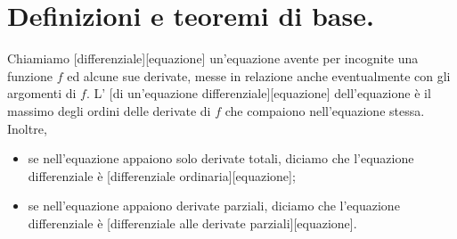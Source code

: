 \section{Definizioni e teoremi di base.}
\label{EquazioniDifferenziali_DefinizioniETeoremiDiBase}
\begin{Definition}
  Chiamiamo
  [differenziale][equazione]
  un'equazione avente per incognite una funzione $f$ ed alcune sue derivate,
  messe in relazione anche eventualmente con gli argomenti di $f$.
  L'
  [di un'equazione differenziale][equazione]
  dell'equazione \`e il massimo degli ordini delle derivate di $f$ che
  compaiono nell'equazione stessa.
  Inoltre,
  \begin{itemize}
    \item se nell'equazione appaiono solo derivate totali, diciamo che l'equazione
      differenziale \`e
      [differenziale ordinaria][equazione];
    \item se nell'equazione appaiono derivate parziali, diciamo che l'equazione
      differenziale \`e
      [differenziale alle derivate parziali][equazione].
  \end{itemize}
\end{Definition}
